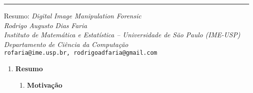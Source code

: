 \noindent\rule{14.5cm}{0.4pt}

\begin{center}
    {\Large Resumo: \textit{Digital Image Manipulation Forensic}}
    \\[8pt]
    
    \textit{Rodrigo Augusto Dias Faria}
    \\[8pt]
    
    \textit{Instituto de Matemática e Estatística -- Universidade de São Paulo (IME-USP)\\
    Departamento de Ciência da Computação
    }\\[8pt]
    
    \texttt{rofaria@ime.usp.br, rodrigoadfaria@gmail.com}
\end{center}

\begin{enumerate}
  \item \textbf{Resumo}
    \begin{enumerate}[label*=\arabic*.]
      \item \textbf{Motivação}


\end{enumerate}
\end{enumerate}
